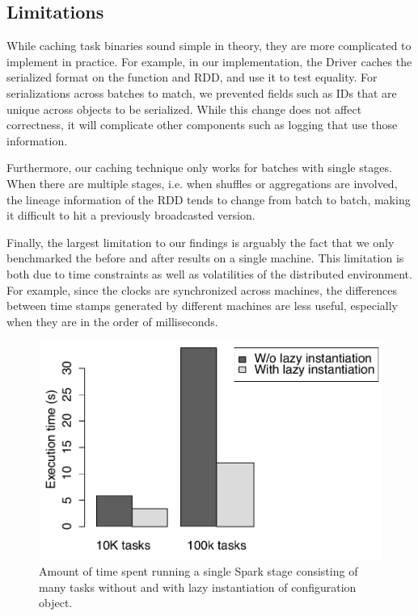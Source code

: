 \subsection{Limitations}
While caching task binaries sound simple in theory, they are more complicated to implement in practice. For example, in our implementation, the Driver caches the serialized format on the function and RDD, and use it to test equality. For serializations across batches to match, we prevented fields such as IDs that are unique across objects to be serialized. While this change does not affect correctness, it will complicate other components such as logging that use those information.

Furthermore, our caching technique only works for batches with single stages. When there are multiple stages, i.e. when shuffles or aggregations are involved, the lineage information of the RDD tends to change from batch to batch, making it difficult to hit a previously broadcasted version.

Finally, the largest limitation to our findings is arguably the fact that we only benchmarked the before and after results on a single machine. This limitation is both due to time constraints as well as volatilities of the distributed environment. For example, since the clocks are synchronized across machines, the differences between time stamps generated by different machines are less useful, especially when they are in the order of milliseconds.

\begin{figure}[t!]
 \begin{center}
   \includegraphics[scale=0.50]{images_graphs/optimizations/graph1/lazy_micro.pdf}
 \end{center}
 \caption{Amount of time spent running a single Spark stage consisting of many tasks without and with lazy instantiation of configuration object.}
 \label{fig:lazy_micro}
\end{figure}

